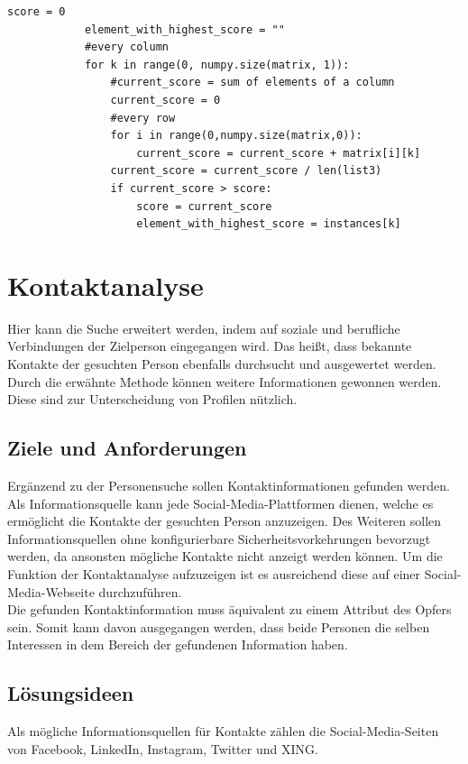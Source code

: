 		\begin{lstlisting}[caption=Algorithmus zur Berechnung des Scores und der Auswahl des Elementes mit dem höchsten Score,label={lst:algoScore}]
			score = 0
			element_with_highest_score = ""
			#every column
			for k in range(0, numpy.size(matrix, 1)):
				#current_score = sum of elements of a column
				current_score = 0
				#every row
				for i in range(0,numpy.size(matrix,0)):
					current_score = current_score + matrix[i][k]
				current_score = current_score / len(list3)
				if current_score > score:
					score = current_score
					element_with_highest_score = instances[k]
		\end{lstlisting}

\section{Kontaktanalyse}
\label{subsec:Kontaktanalyse}
Hier kann die Suche erweitert werden, indem auf soziale und berufliche Verbindungen der Zielperson eingegangen wird. Das heißt, dass bekannte Kontakte der gesuchten Person ebenfalls durchsucht und ausgewertet werden. 	
Durch die erwähnte Methode können weitere Informationen gewonnen werden. Diese sind zur Unterscheidung von Profilen nützlich.
	\subsection{Ziele und Anforderungen}
	Ergänzend zu der Personensuche sollen Kontaktinformationen gefunden werden.  Als Informationsquelle kann jede Social-Media-Plattformen dienen, welche es ermöglicht die Kontakte der gesuchten Person anzuzeigen.  Des Weiteren sollen Informationsquellen ohne  konfigurierbare Sicherheitsvorkehrungen bevorzugt werden, da ansonsten mögliche Kontakte nicht anzeigt werden können.  Um die Funktion der Kontaktanalyse aufzuzeigen ist es ausreichend diese auf einer Social-Media-Webseite durchzuführen.\\
	Die gefunden Kontaktinformation muss äquivalent zu  einem Attribut  des Opfers sein. Somit kann davon ausgegangen werden, dass beide Personen die selben Interessen in dem Bereich der gefundenen Information haben. 
	
	\subsection{Lösungsideen} 
	Als mögliche Informationsquellen für Kontakte zählen die Social-Media-Seiten von Facebook, LinkedIn, Instagram, Twitter und XING.

